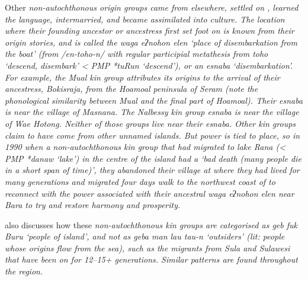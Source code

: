 Other \it{non-autochthonous} origin groups came from elsewhere,
settled on , learned the language,
intermarried, and became assimilated into  culture.
The location where their founding ancestor or ancestress first
set foot on  is known from their origin stories,
and is called the \it{waga eʔnohon elen} ‘place of disembarkation
from the boat’ (from /en-toho-n/ with regular participial metathesis
from \it{toho} ‘descend, disembark’ < PMP *tuRun ‘descend’),
or an \it{esnaba} ‘disembarkation’.
For example, the \it{Mual} kin group attributes its origins to
the arrival of their ancestress,
Bokisraja, from the Hoamoal peninsula of Seram (note the phonological
similarity between \it{Mual} and the final part of Hoa\emph{moal}).
Their \it{esnaba} is near the village of Masnana.
The Nalbessy kin group \it{esnaba} is near the village of Wae Hotong.
Neither of those groups live near their \it{esnaba}.
Other kin groups claim to have come from other unnamed islands.
But power is tied to place,
so in 1990 when a non-autochthonous kin group that had migrated
to lake \it{Rana} (< PMP *danaw ‘lake’) in the centre of the
island had a ‘bad death (many people die in a short span of time)’,
they abandoned their village at  where they had lived for
many generations and migrated four days walk to the northwest coast of  to
reconnect with the power associated with their ancestral \it{waga
eʔnohon elen} near Bara to try
and restore harmony and prosperity.

\citet{Grimes1993} also discusses how these \it{non-autochthonous}
kin groups are categorised as \it{geb fuk Buru} ‘people of 
island’, and not as \it{geba man lau tau-n} ‘outsiders’ (lit: people whose
origins flow from the sea),
such as the migrants from Sula
and Sulawesi that have been on  for 12--15+ generations.
Similar patterns are found throughout the region.

